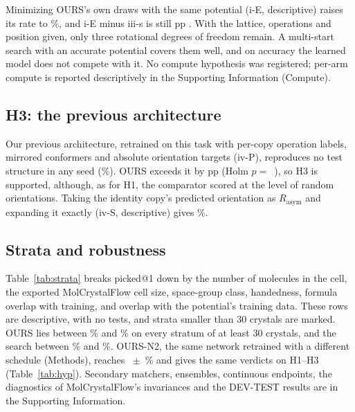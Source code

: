 \documentclass[journal=acsodf,manuscript=article]{achemso}
\begin{document}
Minimizing OURS's own draws with the same potential (i-E, descriptive) raises its rate to
\nIEPick\%, and i-E minus iii-s is still \nIEvsSearchDelta{} pp \nIEvsSearchCI. With the
lattice, operations and position given, only three rotational degrees of freedom remain. A
multi-start search with an accurate potential covers them well, and on accuracy the learned
model does not compete with it. No compute hypothesis was registered; per-arm compute is
reported descriptively in the Supporting Information (Compute).

\subsection{H3: the previous architecture}
Our previous architecture, retrained on this task with per-copy operation labels, mirrored
conformers and absolute orientation targets (iv-P), reproduces no test structure in any seed
(\nIvPPick\%). OURS exceeds it by \nHThreeDelta{} pp \nHThreeCI{} (Holm $p=$~\nHThreeP), so H3
is supported, although, as for H1, the comparator scored at the level of random
orientations. Taking the identity copy's predicted
orientation as $R_{\text{asym}}$ and expanding it exactly (iv-S, descriptive) gives
\nIvSPick\%.

\subsection{Strata and robustness}
Table~\ref{tab:strata} breaks picked@1 down by the number of molecules in the cell, the
exported MolCrystalFlow cell size, space-group class, handedness, formula overlap with
training, and overlap with the potential's training data. These rows are descriptive, with
no tests, and strata smaller than 30 crystals are marked. OURS lies between \nOursStratMin\%
and \nOursStratMax\% on every stratum of at least 30 crystals, and the search between
\nSearchStratMin\% and \nSearchStratMax\%. OURS-N2, the same network retrained with a
different schedule (Methods), reaches \nOursNtwoPick~$\pm$~\nOursNtwoSd\% and gives the same
verdicts on H1--H3
(Table~\ref{tab:hyp}). Secondary matchers, ensembles, continuous endpoints, the
diagnostics of MolCrystalFlow's invariances and the DEV-TEST results are in the Supporting
Information.
\end{document}
